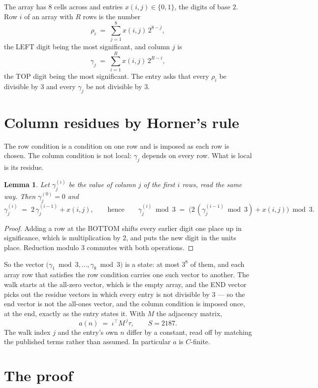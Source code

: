 \documentclass[11pt,a4paper]{article}
\theoremstyle{plain}
\newtheorem{lemma}[theorem]{Lemma}
\theoremstyle{definition}
\begin{document}
The array has $8$ cells across and entries $x(i,j)\in\{0,1\}$, the digits of
base $2$. Row $i$ of an array with $R$ rows is the number
\[
\rho_i\;=\;\sum_{j=1}^{8}x(i,j)\,2^{8-j} ,
\]
the LEFT digit being the most significant, and column $j$ is
\[
\gamma_j\;=\;\sum_{i=1}^{R}x(i,j)\,2^{R-i} ,
\]
the TOP digit being the most significant. The entry asks that every $\rho_i$ be divisible by
$3$ and every $\gamma_j$ be not divisible by $3$.


\section{Column residues by Horner's rule}

The row condition is a condition on one row and is imposed as each row is chosen. The column
condition is not local: $\gamma_j$ depends on every row. What is local is its residue.

\begin{lemma}\label{lem:horner}
Let $\gamma_j^{(i)}$ be the value of column $j$ of the first $i$ rows, read the same way.
Then $\gamma_j^{(0)}=0$ and
\[
\gamma_j^{(i)}\;=\;2\,\gamma_j^{(i-1)}+x(i,j),
\qquad\text{hence}\qquad
\gamma_j^{(i)}\bmod 3\;=\;
\bigl(2\,(\gamma_j^{(i-1)}\bmod 3)+x(i,j)\bigr)\bmod 3 .
\]
\end{lemma}

\begin{proof}
Adding a row at the BOTTOM shifts every earlier digit one place up in significance, which is
multiplication by $2$, and puts the new digit in the units place. Reduction modulo
$3$ commutes with both operations.
\end{proof}

So the vector $\bigl(\gamma_1\bmod 3,\dots,\gamma_{8}\bmod
3\bigr)$ is a state: at most $3^{8}$ of them, and each array row
that satisfies the row condition carries one such vector to another. The walk starts at the
all-zero vector, which is the empty array, and the END vector picks out the residue vectors in
which every entry is not divisible by $3$ --- so the end vector is not the all-ones
vector, and the column condition is imposed once, at the end, exactly as the entry states it.
With $M$ the adjacency matrix,
\[
a(n)\;=\;\iota^{\!\top}M^{\,j}\tau ,\qquad S=2187.
\]
The walk index $j$ and the entry's own $n$ differ by a constant, read off by matching the
published terms rather than assumed. In particular $a$ is $C$-finite.

\section{The proof}
\end{document}
